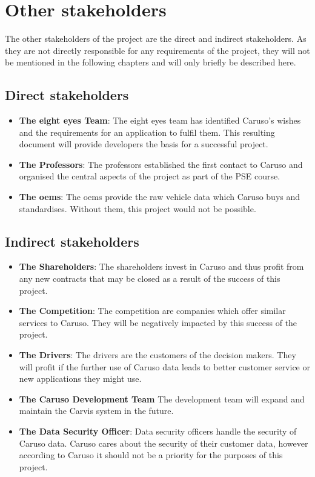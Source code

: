\section{Other \Glspl{stakeholder}}
The other \glspl{stakeholder} of the project are the direct and indirect \glspl{stakeholder}. As they are not directly responsible for any requirements of the project, they will not be mentioned in the following chapters and will only briefly be described here.

\subsection{Direct \Glspl{stakeholder}}
\begin{itemize}
  \item \textbf{The eight eyes Team}: The eight eyes team has identified Caruso's wishes and the requirements for an application to fulfil them. This resulting document will provide developers the basis for a successful project.
  \item \textbf{The Professors}: The professors established the first contact to Caruso and organised the central aspects of the project as part of the PSE course.
  \item \textbf{The \glspl{oem}}: The \glspl{oem} provide the raw vehicle data which Caruso buys and standardises. Without them, this project would not be possible.
\end{itemize}

\subsection{Indirect \Glspl{stakeholder}}
\begin{itemize}
  \item \textbf{The Shareholders}: The shareholders invest in Caruso and thus profit from any new contracts that may be closed as a result of the success of this project.
  \item \textbf{The Competition}: The competition are companies which offer similar services to Caruso. They will be negatively impacted by this success of the project.
  \item \textbf{The Drivers}: The drivers are the customers of the decision makers. They will profit if the further use of Caruso data leads to better customer service or new applications they might use.
  \item \textbf{The Caruso Development Team} The development team will expand and maintain the Carvis system in the future.
  \item \textbf{The Data Security Officer}: Data security officers handle the security of Caruso data. Caruso cares about the security of their customer data, however according to Caruso it should not be a priority for the purposes of this project.
\end{itemize}

